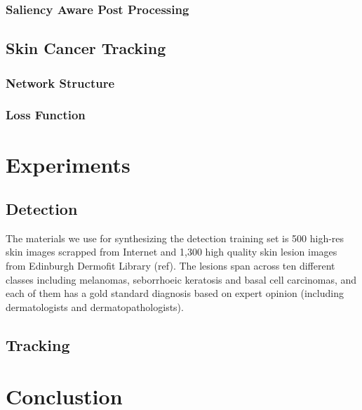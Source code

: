 \documentclass[letterpaper]{article}
\begin{document}
\subsubsection{Saliency Aware Post Processing}



\subsection{Skin Cancer Tracking}

\subsubsection{Network Structure}

\subsubsection{Loss Function}

\section{Experiments}

\subsection{Detection}

The materials we use for synthesizing the detection training set is 500 high-res skin images scrapped from Internet and 1,300 high quality skin lesion images from Edinburgh Dermofit Library (ref). The lesions span across ten different classes including melanomas, seborrhoeic keratosis and basal cell carcinomas, and each of them has a gold standard diagnosis based on expert opinion (including dermatologists and dermatopathologists).


\subsection{Tracking}


\section{Conclustion}
\end{document}
